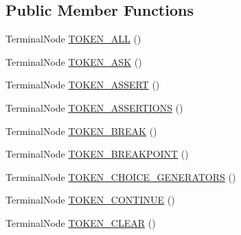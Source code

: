\subsection*{Public Member Functions}
\begin{DoxyCompactItemize}
\item 
Terminal\+Node \hyperlink{classgov_1_1nasa_1_1jpf_1_1inspector_1_1client_1_1parser_1_1_console_grammar_parser_1_1_all_key_5423188b2439879f44801649cdee10f6_ac71187609903dafef0e37c4c8ff0c665}{T\+O\+K\+E\+N\+\_\+\+A\+LL} ()
\item 
Terminal\+Node \hyperlink{classgov_1_1nasa_1_1jpf_1_1inspector_1_1client_1_1parser_1_1_console_grammar_parser_1_1_all_key_5423188b2439879f44801649cdee10f6_a7c8d0b4aea34933daf337c8ed717f753}{T\+O\+K\+E\+N\+\_\+\+A\+SK} ()
\item 
Terminal\+Node \hyperlink{classgov_1_1nasa_1_1jpf_1_1inspector_1_1client_1_1parser_1_1_console_grammar_parser_1_1_all_key_5423188b2439879f44801649cdee10f6_a424c7fd48148c2fddb1047117dd3374a}{T\+O\+K\+E\+N\+\_\+\+A\+S\+S\+E\+RT} ()
\item 
Terminal\+Node \hyperlink{classgov_1_1nasa_1_1jpf_1_1inspector_1_1client_1_1parser_1_1_console_grammar_parser_1_1_all_key_5423188b2439879f44801649cdee10f6_adae63c017fbe47bc9bdab935ce12dbb4}{T\+O\+K\+E\+N\+\_\+\+A\+S\+S\+E\+R\+T\+I\+O\+NS} ()
\item 
Terminal\+Node \hyperlink{classgov_1_1nasa_1_1jpf_1_1inspector_1_1client_1_1parser_1_1_console_grammar_parser_1_1_all_key_5423188b2439879f44801649cdee10f6_ae1cff75580129746947a37d0f404ccaa}{T\+O\+K\+E\+N\+\_\+\+B\+R\+E\+AK} ()
\item 
Terminal\+Node \hyperlink{classgov_1_1nasa_1_1jpf_1_1inspector_1_1client_1_1parser_1_1_console_grammar_parser_1_1_all_key_5423188b2439879f44801649cdee10f6_a78a158983bf333a3cf6f728e2b036380}{T\+O\+K\+E\+N\+\_\+\+B\+R\+E\+A\+K\+P\+O\+I\+NT} ()
\item 
Terminal\+Node \hyperlink{classgov_1_1nasa_1_1jpf_1_1inspector_1_1client_1_1parser_1_1_console_grammar_parser_1_1_all_key_5423188b2439879f44801649cdee10f6_ac5f5e4255374db3233c155dfc2eb3328}{T\+O\+K\+E\+N\+\_\+\+C\+H\+O\+I\+C\+E\+\_\+\+G\+E\+N\+E\+R\+A\+T\+O\+RS} ()
\item 
Terminal\+Node \hyperlink{classgov_1_1nasa_1_1jpf_1_1inspector_1_1client_1_1parser_1_1_console_grammar_parser_1_1_all_key_5423188b2439879f44801649cdee10f6_ae654a49cc3c9f2f0d9ec7f318b0adbf6}{T\+O\+K\+E\+N\+\_\+\+C\+O\+N\+T\+I\+N\+UE} ()
\item 
Terminal\+Node \hyperlink{classgov_1_1nasa_1_1jpf_1_1inspector_1_1client_1_1parser_1_1_console_grammar_parser_1_1_all_key_5423188b2439879f44801649cdee10f6_a51a6ca57a8828cf0709a100ff9de1fe5}{T\+O\+K\+E\+N\+\_\+\+C\+L\+E\+AR} ()

\end{DoxyCompactItemize}
